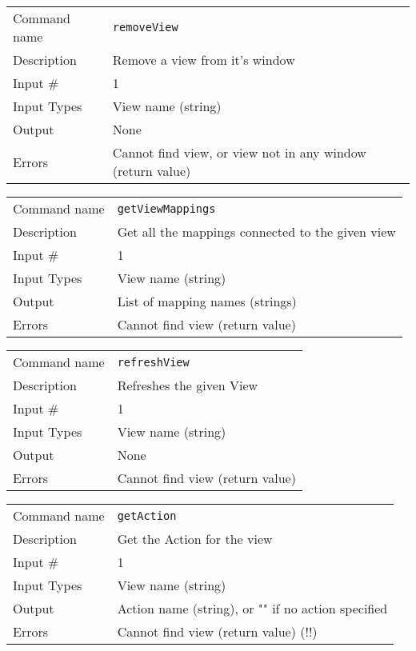 \bigskip

\noindent
\begin{tabular}{l|p{5in}}
\hline
Command name & {\tt removeView} \\
Description  & Remove a view from it's window \\
Input \#     & 1 \\
Input Types  & View name (string) \\
Output       & None \\
Errors       & Cannot find view, or view not in any window (return value) \\
\hline
\end{tabular}

\bigskip

\noindent
\begin{tabular}{l|p{5in}}
\hline
Command name & {\tt getViewMappings} \\
Description  & Get all the mappings connected to the given view \\
Input \#     & 1 \\
Input Types  & View name (string) \\
Output       & List of mapping names (strings) \\
Errors       & Cannot find view (return value) \\
\hline
\end{tabular}

\bigskip

\noindent
\begin{tabular}{l|p{5in}}
\hline
Command name & {\tt refreshView} \\
Description  & Refreshes the given View \\
Input \#     & 1 \\
Input Types  & View name (string) \\
Output       & None \\
Errors       & Cannot find view (return value) \\
\hline
\end{tabular}

\bigskip

\noindent
\begin{tabular}{l|p{5in}}
\hline
Command name & {\tt getAction} \\
Description  & Get the Action for the view \\
Input \#     & 1 \\
Input Types  & View name (string) \\
Output       & Action name (string), or "" if no action specified \\
Errors       & Cannot find view (return value) (!!) \\
\hline
\end{tabular}

